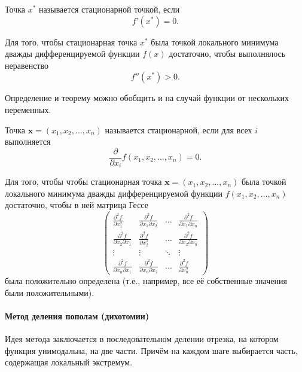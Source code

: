 \begin{defn}
Точка $x^{*}$ называется стационарной точкой, если
\[
f\text{'}(x^{*})=0.
\]
\end{defn}
\begin{thm}
Для того, чтобы стационарная точка $x^{*}$ была точкой локального
минимума дважды дифференцируемой функции $f(x)$ достаточно, чтобы
выполнялось неравенство
\[
f''(x^{*})>0.
\]

\end{thm}
Определение и теорему можно обобщить и на случай функции от нескольких
переменных.
\begin{defn}
Точка $\mathbf{x}=(x_{1},x_{2},\dots,x_{n})$ называется стационарной,
если для всех $i$ выполняется 
\[
\frac{\partial}{\partial x_{i}}f(x_{1},x_{2},\dots,x_{n})=0.
\]
\end{defn}
\begin{thm}
Для того, чтобы чтобы стационарная точка $\mathbf{x}=(x_{1},x_{2},\dots,x_{n})$
была точкой локального минимума дважды дифференцируемой функции $f(x_{1},x_{2},\dots,x_{n})$
достаточно, чтобы в ней матрица Гессе 
\[
\begin{pmatrix}\frac{\partial^{2}f}{\partial x_{1}^{2}} & \frac{\partial^{2}f}{\partial x_{1}\partial x_{2}} & \ldots & \frac{\partial^{2}f}{\partial x_{1}\partial x_{n}}\\
\frac{\partial^{2}f}{\partial x_{2}\partial x_{1}} & \frac{\partial^{2}f}{\partial x_{2}^{2}} & \ldots & \frac{\partial^{2}f}{\partial x_{2}\partial x_{n}}\\
\vdots & \vdots & \ddots & \vdots\\
\frac{\partial^{2}f}{\partial x_{n}\partial x_{1}} & \frac{\partial^{2}f}{\partial x_{n}\partial x_{2}} & \ldots & \frac{\partial^{2}f}{\partial x_{n}^{2}}
\end{pmatrix}
\]
была положительно определена (т.е., например, все её собственные значения
были положительными).
\end{thm}



\paragraph{Метод деления пополам (дихотомии)}

Идея метода заключается в последовательном делении отрезка, на котором
функция унимодальна, на две части. Причём на каждом шаге выбирается
часть, содержащая локальный экстремум.

